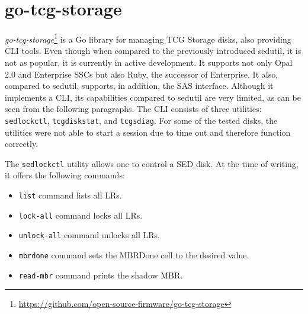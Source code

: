 




\section{go-tcg-storage}


\emph{go-tcg-storage}\footnote{\url{https://github.com/open-source-firmware/go-tcg-storage}} is a Go library for managing TCG Storage disks, also providing CLI tools. Even though when compared to the previously introduced sedutil, it is not as popular, it is currently in active development. It supports not only Opal 2.0 and Enterprise SSCs but also Ruby, the successor of Enterprise. It also, compared to sedutil, supports, in addition, the SAS interface.
Although it implements a CLI, its capabilities compared to sedutil are very limited, as can be seen from the following paragraphs. The CLI consists of three utilities: \verb|sedlockctl|, \verb|tcgdiskstat|, and \verb|tcgsdiag|. 
For some of the tested disks, the utilities were not able to start a session due to time out and therefore function correctly.



The \verb|sedlockctl| utility allows one to control a SED disk. At the time of writing, it offers the following commands: \begin{itemize}
 \item \verb|list| command lists all LRs.
 \item \verb|lock-all| command locks all LRs.
 \item \verb|unlock-all| command unlocks all LRs.
 \item \verb|mbrdone| command sets the MBRDone cell to the desired value.
 \item \verb|read-mbr| command prints the shadow MBR.
\end{itemize}

